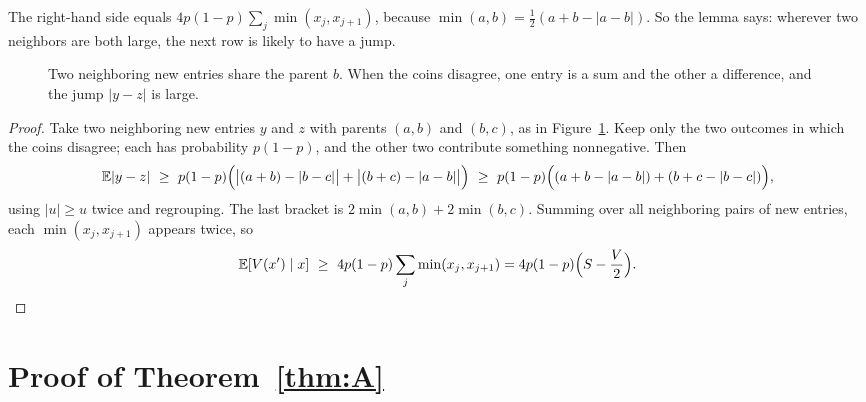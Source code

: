 \documentclass[11pt]{article}
\theoremstyle{remark}
\newcommand{\E}{\mathbb{E}}
\begin{document}
The right-hand side equals $4p(1-p)\sum_j\min(x_j,x_{j+1})$, because $\min(a,b)=\tfrac12(a+b-|a-b|)$. So the lemma says: wherever two neighbors are both large, the next row is likely to have a jump.

\begin{figure}[ht]
\centering
{}
\caption{Two neighboring new entries share the parent $b$. When the coins disagree, one entry is a sum and the other a difference, and the jump $|y-z|$ is large.}
\label{fig:coins}
\end{figure}

\begin{proof}
Take two neighboring new entries $y$ and $z$ with parents $(a,b)$ and $(b,c)$, as in Figure~\ref{fig:coins}. Keep only the two outcomes in which the coins disagree; each has probability $p(1-p)$, and the other two contribute something nonnegative. Then
\[
\E|y-z|\ \ge\ p(1-p)\Bigl(\bigl|(a+b)-|b-c|\bigr|+\bigl|(b+c)-|a-b|\bigr|\Bigr)
\ \ge\ p(1-p)\Bigl((a+b-|a-b|)+(b+c-|b-c|)\Bigr),
\]
using $|u|\ge u$ twice and regrouping. The last bracket is $2\min(a,b)+2\min(b,c)$. Summing over all neighboring pairs of new entries, each $\min(x_j,x_{j+1})$ appears twice, so
\[
\E[V(x')\mid x]\ \ge\ 4p(1-p)\sum_j\min(x_j,x_{j+1})=4p(1-p)\Bigl(S-\frac V2\Bigr). \qedhere
\]
\end{proof}

\section{Proof of Theorem~\ref{thm:A}}
\end{document}
